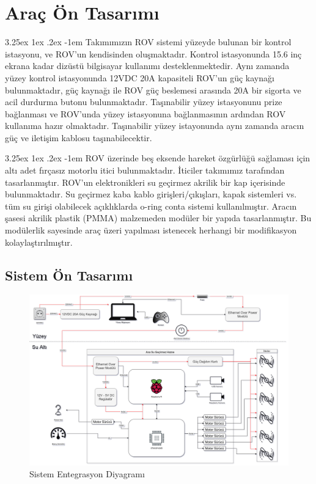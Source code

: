 \documentclass[12pt]{article}
\makeatletter
\renewcommand\paragraph{\@startsection{paragraph}{5}{\z@}%
  {3.25ex \@plus1ex \@minus.2ex}%
  {-1em}%
  {\normalfont\normalsize\bfseries}}
\makeatother
\begin{document}
\section{Araç Ön Tasarımı}

\paragraph{} Takımımızın ROV sistemi yüzeyde bulunan bir kontrol istasyonu, ve ROV'un kendisinden oluşmaktadır. Kontrol istasyonunda 15.6 inç ekrana kadar dizüstü bilgisayar kullanımı desteklenmektedir. Aynı zamanda yüzey kontrol istasyonunda 12VDC 20A kapasiteli ROV'un güç kaynağı bulunmaktadır, güç kaynağı ile ROV güç beslemesi arasında 20A bir sigorta ve acil durdurma butonu bulunmaktadır. Taşınabilir yüzey istasyonunu prize bağlanması ve ROV'unda yüzey istasyonuna bağlanmasının ardından ROV kullanıma hazır olmaktadır. Taşınabilir yüzey istayonunda aynı zamanda aracın güç ve iletişim kablosu taşınabilecektir. 

\paragraph{} ROV üzerinde beş eksende hareket özgürlüğü sağlaması için altı adet fırçasız motorlu itici bulunmaktadır. İticiler takımımız tarafından tasarlanmıştır. ROV'un elektronikleri su geçirmez akrilik bir kap içerisinde bulunmaktadır. Su geçirmez kaba kablo girişleri/çıkışları, kapak sistemleri vs. tüm su girişi olabilecek açıklıklarda o-ring conta sistemi kullanılmıştır. Aracın şasesi akrilik plastik (PMMA) malzemeden modüler bir yapıda tasarlanmıştır. Bu modülerlik sayesinde araç üzeri yapılması istenecek herhangi bir modifikasyon kolaylaştırılmıştır. 

\newpage
\subsection{Sistem Ön Tasarımı}

\begin{figure}[h]
\centering
\includegraphics[width=1\textwidth]{SID.png}
\caption{Sistem Entegrasyon Diyagramı}
\label{fig:SID}
\end{figure}
\end{document}
